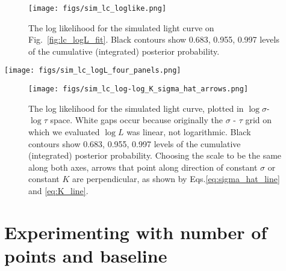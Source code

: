 \documentclass[fleqn,usenatbib]{mnras}  %
\begin{document}
\begin{figure}
\texttt{[image: figs/sim\_lc\_loglike.png]}
\caption{The log likelihood for the simulated light curve on Fig.~\ref{fig:lc_logL_fit}. Black contours show 0.683, 0.955, 0.997 levels of the cumulative (integrated) posterior probability. }
\label{fig:lc_logL}
\end{figure} 





\begin{figure*}
\texttt{[image: figs/sim\_lc\_logL\_four\_panels.png]}
\caption{For each pixel on the  $\sigma$ - $\tau$ grid we evaluated the log-likelihood value, $\log{L}$, shown on the bottom-right panel (same as Fig.~\ref{fig:lc_logL}). In addition, given these  $\sigma$ and $\tau$ we also evaluated $K$ and $\hat{\sigma}$, which enabled, given $\{ \sigma, \tau, \hat{\sigma}, K, \log{L} \}$, plotting $\log{L}$ in space of $K$-$\hat{\sigma}$, or any other parameter as a function of the other two. }
\label{fig:lc_logL_panels}
\end{figure*} 

\begin{figure}
\texttt{[image: figs/sim\_lc\_log-log\_K\_sigma\_hat\_arrows.png]}
\caption{The log likelihood for the simulated light curve, plotted in  $\log{\sigma}$-$\log{\tau}$ space.  White gaps occur because originally the   $\sigma$ - $\tau$ grid on which we evaluated $\log{L}$ was linear, not logarithmic.  Black contours show 0.683, 0.955, 0.997 levels of the cumulative (integrated) posterior probability. Choosing the scale to be the same along both axes,  arrows that point along direction of constant $\hat{\sigma}$ or constant $K$ are perpendicular, as shown by Eqs.\ref{eq:sigma_hat_line} and \ref{eq:K_line}. }
\label{fig:lc_logL_arrows}
\end{figure} 


\section{Experimenting with number of points and baseline}







\end{document}
